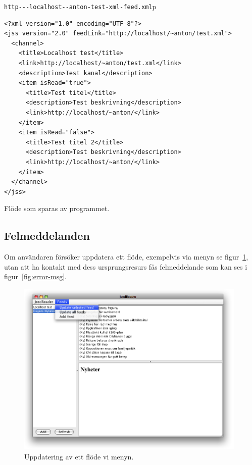 \documentclass[titlepage, twoside, a4paper, 12pt]{article}
\begin{document}
\verb!http---localhost--anton-test-xml-feed.xml!p

\begin{program}
\begin{footnotesize}
\begin{verbatim}
<?xml version="1.0" encoding="UTF-8"?>
<jss version="2.0" feedLink="http://localhost/~anton/test.xml">
  <channel>
    <title>Localhost test</title>
    <link>http://localhost/~anton/test.xml</link>
    <description>Test kanal</description>
    <item isRead="true">
      <title>Test titel</title>
      <description>Test beskrivning</description>
      <link>http://localhost/~anton/</link>
    </item>
    <item isRead="false">
      <title>Test titel 2</title>
      <description>Test beskrivning</description>
      <link>http://localhost/~anton/</link>
    </item>
  </channel>
</jss>
\end{verbatim}
\end{footnotesize}
\caption{Flöde som sparas av programmet.}
\label{verb:jss-xml}
\end{program}

\subsection{Felmeddelanden}
Om användaren försöker uppdatera ett flöde, exempelvis via menyn se
figur~\ref{fig:update-feed}, utan att ha kontakt med dess ursprungsresurs
fås felmeddelande som kan ses i figur~\ref{fig:error-msg}.

\begin{figure}[!hbp]
  \begin{center}
    \includegraphics[width=110mm]{images/update-feed.png}
    \caption{Uppdatering av ett flöde vi menyn.}
    \label{fig:update-feed}
  \end{center}
\end{figure}
\end{document}
